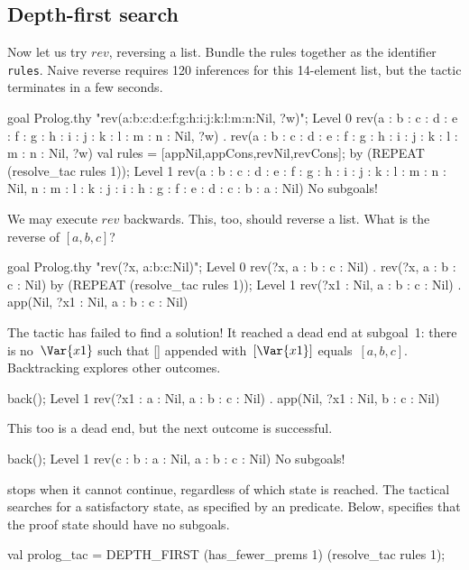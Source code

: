 \subsection{Depth-first search}
Now let us try $rev$, reversing a list.
Bundle the rules together as the \ML{} identifier {\tt rules}.  Naive
reverse requires 120 inferences for this 14-element list, but the tactic
terminates in a few seconds.
\begin{ttbox}
goal Prolog.thy "rev(a:b:c:d:e:f:g:h:i:j:k:l:m:n:Nil, ?w)";
{\out Level 0}
{\out rev(a : b : c : d : e : f : g : h : i : j : k : l : m : n : Nil, ?w)}
{. rev(a : b : c : d : e : f : g : h : i : j : k : l : m : n : Nil, ?w)}
val rules = [appNil,appCons,revNil,revCons];
\ttbreak
by (REPEAT (resolve_tac rules 1));
{\out Level 1}
{\out rev(a : b : c : d : e : f : g : h : i : j : k : l : m : n : Nil,}
{\out     n : m : l : k : j : i : h : g : f : e : d : c : b : a : Nil)}
{\out No subgoals!}
\end{ttbox}
We may execute $rev$ backwards.  This, too, should reverse a list.  What
is the reverse of $[a,b,c]$?
\begin{ttbox}
goal Prolog.thy "rev(?x, a:b:c:Nil)";
{\out Level 0}
{\out rev(?x, a : b : c : Nil)}
{. rev(?x, a : b : c : Nil)}
\ttbreak
by (REPEAT (resolve_tac rules 1));
{\out Level 1}
{\out rev(?x1 : Nil, a : b : c : Nil)}
{. app(Nil, ?x1 : Nil, a : b : c : Nil)}
\end{ttbox}
The tactic has failed to find a solution!  It reached a dead end at
subgoal~1: there is no~$\Var{x1}$ such that [] appended with~$[\Var{x1}]$
equals~$[a,b,c]$.  Backtracking explores other outcomes.
\begin{ttbox}
back();
{\out Level 1}
{\out rev(?x1 : a : Nil, a : b : c : Nil)}
{. app(Nil, ?x1 : Nil, b : c : Nil)}
\end{ttbox}
This too is a dead end, but the next outcome is successful.
\begin{ttbox}
back();
{\out Level 1}
{\out rev(c : b : a : Nil, a : b : c : Nil)}
{\out No subgoals!}
\end{ttbox}
 stops when it cannot continue, regardless of which state
is reached.  The tactical  searches for a satisfactory
state, as specified by an \ML{} predicate.  Below,
 specifies that the proof state should have no
subgoals.  
\begin{ttbox}
val prolog_tac = DEPTH_FIRST (has_fewer_prems 1) 
                             (resolve_tac rules 1);
\end{ttbox}
